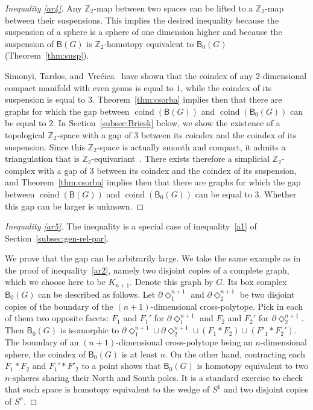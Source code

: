 \documentclass[12pt]{amsart}
\theoremstyle{definition}
\def\Z{\mathbb{Z}}
\def\B{\mathsf{B}}
\def\coind{\operatorname{coind}}
\begin{document}
\begin{proof}[Inequality \eqref{ar4}]
Any $\Z_2$-map between two spaces can be lifted to a $\Z_2$-map between their suspensions. This implies the desired inequality because the suspension of a sphere is a sphere of one dimension higher and because the suspension of $\B(G)$ is $\Z_2$-homotopy equivalent to $\B_0(G)$ (Theorem~\ref{thm:susp}).

Simonyi, Tardos, and~Vre\'cica~\cite{simonyi2009local} have shown that the coindex of any $2$-dimensional compact manifold with even genus is equal to $1$, while the coindex of its suspension is equal to $3$. Theorem~\ref{thm:csorba} implies then that there are graphs for which the gap between $\coind(\B(G))$ and $\coind(\B_0(G))$ can be equal to $2$. In Section~\ref{subsec:Briesk} below, we show the existence of a topological $\Z_2$-space with a gap of $3$ between its coindex and the coindex of its suspension. Since this $\Z_2$-space is actually smooth and compact, it admits a triangulation that is $\Z_2$-equivariant~\cite{illman1978smooth}. There exists therefore a simplicial $\Z_2$-complex with a gap of $3$ between its coindex and the coindex of its suspension, and Theorem~\ref{thm:csorba} implies then that there are graphs for which the gap between $\coind(\B(G))$ and $\coind(\B_0(G))$ can be equal to $3$. Whether this gap can be larger is unknown.
\end{proof}


\begin{proof}[Inequality \eqref{ar5}]
The inequality is a special case of inequality~\eqref{a1} of Section~\ref{subsec:gen-rel-par}.

We prove that the gap can be arbitrarily large. We take the same example as in the proof of inequality~\eqref{ar2}, namely two disjoint copies of a complete graph, which we choose here to be $K_{n+1}$. Denote this graph by $G$. Its box complex $\B_0(G)$ can be described as follows. Let $\partial \Diamond_1^{n+1}$ and $\partial \Diamond_2^{n+1}$ be two disjoint copies of the boundary of the $(n+1)$-dimensional cross-polytope. Pick in each of them two opposite facets: $F_1$ and $F_1'$ for $\partial \Diamond_1^{n+1}$ and $F_2$ and $F_2'$ for $\partial \Diamond_2^{n+1}$. Then $\B_0(G)$ is isomorphic to $\partial \Diamond_1^{n+1} \cup \partial \Diamond_2^{n+1} \cup (F_1 * F_2) \cup (F'_1 * F_2')$. The boundary of an $(n+1)$-dimensional cross-polytope being an $n$-dimensional sphere, the coindex of $\B_0(G)$ is at least $n$. On the other hand, contracting each $F_1*F_2$ and $F_1'*F'_2$ to a point shows that $\B_0(G)$ is homotopy equivalent to two $n$-spheres sharing their North and South poles. It is a standard exercise to check that such space is homotopy equivalent to the wedge of $S^1$ and two disjoint copies of $S^n$.%
\end{proof}
\end{document}
